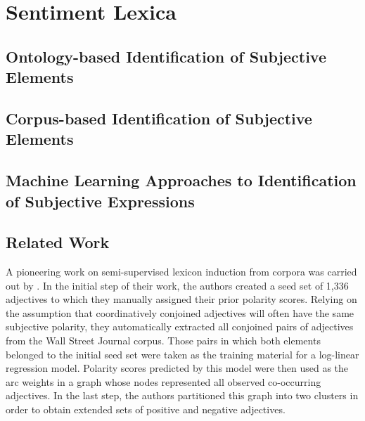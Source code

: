 

\section{Sentiment Lexica}
\subsection{Ontology-based Identification of Subjective Elements}
\subsection{Corpus-based Identification of Subjective Elements}
\subsection{Machine Learning Approaches to Identification of Subjective Expressions}

\subsection{Related Work}

A pioneering work on semi-supervised lexicon induction from corpora
was carried out by \citet{Hatzivassi:97}.  In the initial step of
their work, the authors created a seed set of 1,336 adjectives to
which they manually assigned their prior polarity scores.  Relying on
the assumption that coordinatively conjoined adjectives will often
have the same subjective polarity, they automatically extracted all
conjoined pairs of adjectives from the Wall Street Journal corpus.
Those pairs in which both elements belonged to the initial seed set
were taken as the training material for a log-linear regression model.
Polarity scores predicted by this model were then used as the arc
weights in a graph whose nodes represented all observed co-occurring
adjectives.  In the last step, the authors partitioned this graph into
two clusters in order to obtain extended sets of positive and negative
adjectives.

